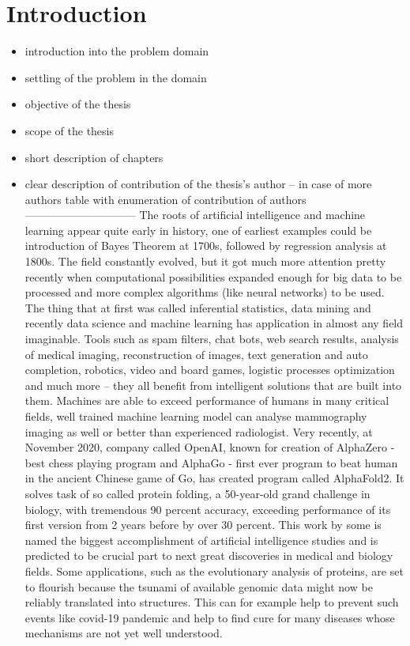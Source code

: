 \documentclass[a4paper,twoside,12pt]{book}
\begin{document}


\chapter{Introduction}

\begin{itemize}
\item introduction into the problem domain
\item settling of the problem in the domain
\item objective of the thesis
\item scope of the thesis
\item short description of chapters
\item clear description of contribution of the thesis's author – in case of more authors table with enumeration of contribution of authors
\newline
------------------------------
\newline
The roots of artificial intelligence and machine learning appear quite early in history, one of earliest examples could be introduction of Bayes Theorem at 1700s, followed by regression analysis at 1800s. The field constantly evolved, but it got much more attention pretty recently when computational possibilities expanded enough for big data to be processed and more complex algorithms (like neural networks) to be used.
The thing that at first was called inferential statistics, data mining and recently data science and machine learning has application in almost any field imaginable. Tools such as spam filters, chat bots, web search results, analysis of medical imaging, reconstruction of images, text generation and auto completion, robotics, video and board games, logistic processes optimization and much more -- they all benefit from intelligent solutions that are built into them.
Machines are able to exceed performance of humans in many critical fields, well trained machine learning model can analyse mammography imaging as well or better than experienced radiologist\cite{inproceedings}. Very recently, at November 2020, company called OpenAI, known for creation of AlphaZero\cite{silver2017mastering} - best chess playing program and AlphaGo\cite{alpha_go} - first ever program to beat human in the ancient Chinese game of Go, has created program called AlphaFold2\cite{alpha_fold}. It solves task of so called protein folding, a 50-year-old grand challenge in biology, with tremendous 90 percent accuracy, exceeding performance of its first version from 2 years before by over 30 percent. This work by some is named the biggest accomplishment of artificial intelligence studies and is predicted to be crucial part to next great discoveries in medical and biology fields. Some applications, such as the evolutionary analysis of proteins, are set to flourish because the tsunami of available genomic data might now be reliably translated into structures. This can for example help to prevent such events like covid-19 pandemic and help to find cure for many diseases whose mechanisms are not yet well understood.

\end{itemize}
\end{document}
